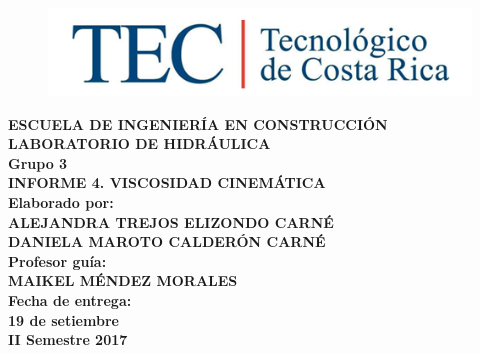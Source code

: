\documentclass[12, letterpaper]{article}
\begin{document}
\begin{titlepage}

\begin{center} 

\begin{figure}[H]
	\centering
	\includegraphics[width=1\columnwidth]{LOGO_TEC.png}
\end{figure}

	\textbf{\large{ESCUELA DE INGENIERÍA EN CONSTRUCCIÓN}}\\
	\textbf{\large{LABORATORIO DE HIDRÁULICA}}\\
	\textbf{\large{Grupo 3}} \\

\vspace{1in} %
\textbf{\large{INFORME 4. VISCOSIDAD CINEMÁTICA}}\\
\vspace{1in}
\textbf{\large{Elaborado por:}}\\
\textbf{\large{ALEJANDRA TREJOS ELIZONDO  CARNÉ}}\\
\textbf{\large{DANIELA MAROTO CALDERÓN  CARNÉ}}\\
\vspace{0.5in}
\textbf{\large{Profesor guía:}}\\
\textbf{\large{MAIKEL MÉNDEZ MORALES}}\\
\vspace{0.5in}
\textbf{\large{Fecha de entrega:}}\\
\textbf{\large{19 de setiembre}}\\
\vspace{1in}
\textbf{\large{II Semestre 2017}}\\

\end{center}

\end{titlepage}
\end{document}
